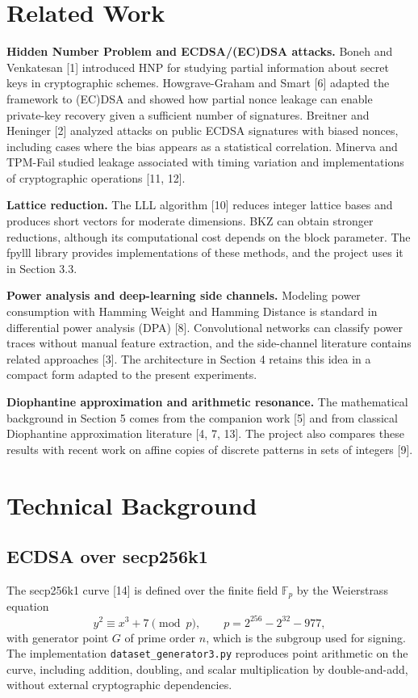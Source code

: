 \documentclass[11pt,a4paper]{article}
\begin{document}
\section{Related Work}

\textbf{Hidden Number Problem and ECDSA/(EC)DSA attacks.}
Boneh and Venkatesan [1] introduced HNP for studying partial information about secret keys in cryptographic schemes. Howgrave-Graham and Smart [6] adapted the framework to (EC)DSA and showed how partial nonce leakage can enable private-key recovery given a sufficient number of signatures. Breitner and Heninger [2] analyzed attacks on public ECDSA signatures with biased nonces, including cases where the bias appears as a statistical correlation. Minerva and TPM-Fail studied leakage associated with timing variation and implementations of cryptographic operations [11, 12].

\textbf{Lattice reduction.}
The LLL algorithm [10] reduces integer lattice bases and produces short vectors for moderate dimensions. BKZ can obtain stronger reductions, although its computational cost depends on the block parameter. The fpylll library provides implementations of these methods, and the project uses it in Section 3.3.

\textbf{Power analysis and deep-learning side channels.}
Modeling power consumption with Hamming Weight and Hamming Distance is standard in differential power analysis (DPA) [8]. Convolutional networks can classify power traces without manual feature extraction, and the side-channel literature contains related approaches [3]. The architecture in Section 4 retains this idea in a compact form adapted to the present experiments.

\textbf{Diophantine approximation and arithmetic resonance.}
The mathematical background in Section 5 comes from the companion work [5] and from classical Diophantine approximation literature [4, 7, 13]. The project also compares these results with recent work on affine copies of discrete patterns in sets of integers [9].

\section{Technical Background}

\subsection{ECDSA over secp256k1}

The secp256k1 curve [14] is defined over the finite field $\mathbb F_p$ by the Weierstrass equation
\[
y^2\equiv x^3+7\pmod p,
\qquad
p=2^{256}-2^{32}-977,
\]
with generator point $G$ of prime order $n$, which is the subgroup used for signing. The implementation \texttt{dataset\_generator3.py} reproduces point arithmetic on the curve, including addition, doubling, and scalar multiplication by double-and-add, without external cryptographic dependencies.
\end{document}
